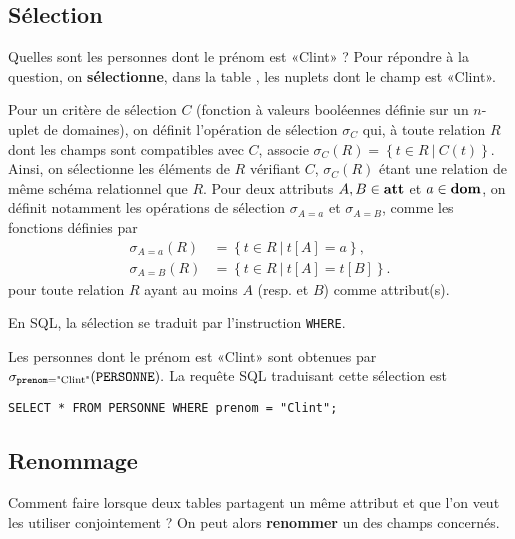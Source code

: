 \subsection{Sélection}

Quelles sont les personnes dont le prénom est «Clint» ? Pour répondre à la question, on \textbf{sélectionne}, dans la table
\PERSONNE{}, les nuplets dont le champ \ttprenom{} est «Clint».

\begin{defi}[Sélection]
  Pour un critère de sélection $C$ (fonction à valeurs booléennes définie sur un $n$-uplet de domaines), on définit l'opération de sélection $\sigma_{C}$ qui, à toute relation $R$ dont les champs sont compatibles avec $C$, associe
$    \sigma_C(R) = \left\{t \in R~|~ C(t)\right\}.$
  Ainsi, on sélectionne les éléments de $R$ vérifiant $C$, $\sigma_C(R)$ étant une relation de même schéma relationnel que $R$. 
  Pour deux attributs $A,B\in \mathbf{att}$ et $a\in \mathbf{dom}$, on définit notamment les opérations de 
  sélection $\sigma_{A=a}$ et $\sigma_{A=B}$, comme les fonctions définies
  par
  \begin{align*}
    \sigma_{A=a}(R)&=\left\{t\in R~|~t[A]=a\right\},\\
    \sigma_{A=B}(R)&=\left\{t\in R~|~t[A]=t[B]\right\}.
  \end{align*}
  pour toute relation $R$ ayant au moins $A$ (resp. et $B$) comme 
  attribut(s).
\end{defi}

En SQL, la sélection se traduit par l'instruction \texttt{WHERE}. 
\begin{exemple}
  Les personnes dont le prénom est «Clint» sont obtenues par $
    \sigma_{\mathtt{prenom} = \textrm{"Clint"}}(\mathtt{PERSONNE}).$
  La requête SQL traduisant cette sélection est 
  
  \texttt{SELECT * FROM PERSONNE WHERE prenom = "Clint";}
\end{exemple}

\subsection{Renommage}

Comment faire lorsque deux tables partagent un même attribut et que l'on veut les utiliser conjointement ? 
On peut alors  \textbf{renommer} un des champs concernés. 

